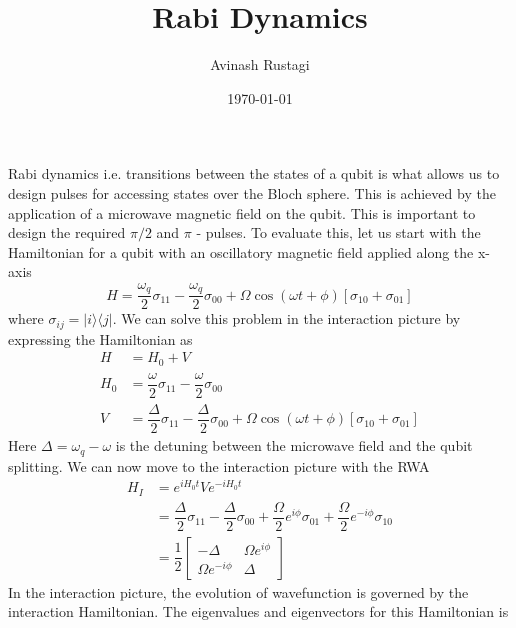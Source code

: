\documentclass[aps,prl,onecolumn,notitlepage,showpacs,floatfix,superscriptaddress]{revtex4-1}
\begin{document}
\title{Rabi Dynamics}

\author{Avinash Rustagi}
\date{\today}
\maketitle

Rabi dynamics i.e. transitions between the states of a qubit is what allows us to design pulses for accessing states over the Bloch sphere. This is achieved by the application of a microwave magnetic field on the qubit. This is important to design the required $\pi/2$ and $\pi$ - pulses. To evaluate this, let us start with the Hamiltonian for a qubit with an oscillatory magnetic field applied along the x-axis
\begin{equation}
H = \dfrac{\omega_q}{2} \sigma_{11} - \dfrac{\omega_q}{2} \sigma_{00} + \Omega \cos(\omega t +\phi) [\sigma_{10}+\sigma_{01}]
\end{equation}
where $\sigma_{ij} = \vert i \rangle \langle j \vert$. We can solve this problem in the interaction picture by expressing the Hamiltonian as
\begin{equation}
\begin{split}
H &= H_0 + V \\
H_0 &= \dfrac{\omega}{2} \sigma_{11} - \dfrac{\omega}{2} \sigma_{00} \\
V &=\dfrac{\Delta}{2} \sigma_{11} - \dfrac{\Delta}{2} \sigma_{00}+ \Omega \cos(\omega t +\phi) [\sigma_{10}+\sigma_{01}]
\end{split}
\end{equation}
Here $\Delta = \omega_q - \omega$ is the detuning between the microwave field and the qubit splitting. We can now move to the interaction picture with the RWA
\begin{equation}
\begin{split}
H_I &= e^{i H_0 t} V e^{-i H_0 t} \\
&= \dfrac{\Delta}{2} \sigma_{11} - \dfrac{\Delta}{2} \sigma_{00}+ \dfrac{\Omega}{2} e^{i\phi} \sigma_{01} + \dfrac{\Omega}{2} e^{-i\phi} \sigma_{10} \\
&= \dfrac{1}{2} \left[ \begin{array}{cc}
-\Delta & \Omega e^{i\phi} \\ 
\Omega e^{-i\phi} & \Delta
\end{array} \right] 
\end{split}
\end{equation}
In the interaction picture, the evolution of wavefunction is governed by the interaction Hamiltonian. The eigenvalues and eigenvectors for this Hamiltonian is
\end{document}
